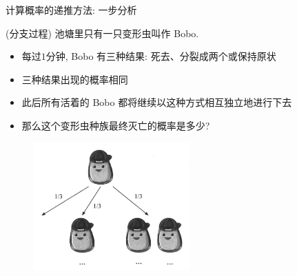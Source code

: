 \begin{frame}{计算概率的递推方法: 一步分析}

 \begin{exam}{\tc (分支过程)}
池塘里只有一只变形虫叫作 Bobo.
\begin{itemize}[<+-|alert@+>]
\item  每过$1$分钟, Bobo 有三种结果: 死去、分裂成两个或保持原状
\item 三种结果出现的概率相同
\item  此后所有活着的 Bobo 都将继续以这种方式相互独立地进行下去
\item  那么这个变形虫种族最终灭亡的概率是多少?
\end{itemize}
\end{exam}
\vspace{-0.2cm}
     \begin{figure}[分支过程.png]
      \centering
      \includegraphics[width=6cm]{figures/分支过程.png}
    \end{figure}
\end{frame}


